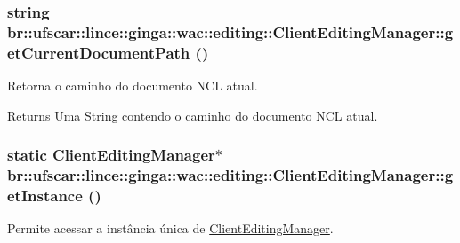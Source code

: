 \hypertarget{classbr_1_1ufscar_1_1lince_1_1ginga_1_1wac_1_1editing_1_1ClientEditingManager_aa305ed84ccf3c46501623df103d7a7e0}{
\subsubsection[{getCurrentDocumentPath}]{\setlength{\rightskip}{0pt plus 5cm}string br::ufscar::lince::ginga::wac::editing::ClientEditingManager::getCurrentDocumentPath ()}}
\label{classbr_1_1ufscar_1_1lince_1_1ginga_1_1wac_1_1editing_1_1ClientEditingManager_aa305ed84ccf3c46501623df103d7a7e0}


Retorna o caminho do documento NCL atual. 

\begin{DoxyReturn}{Returns}
Uma String contendo o caminho do documento NCL atual. 
\end{DoxyReturn}
\hypertarget{classbr_1_1ufscar_1_1lince_1_1ginga_1_1wac_1_1editing_1_1ClientEditingManager_ad72c33ccec250438af9b2c489634c42d}{
\subsubsection[{getInstance}]{\setlength{\rightskip}{0pt plus 5cm}static {\bf ClientEditingManager}$\ast$ br::ufscar::lince::ginga::wac::editing::ClientEditingManager::getInstance ()}}
\label{classbr_1_1ufscar_1_1lince_1_1ginga_1_1wac_1_1editing_1_1ClientEditingManager_ad72c33ccec250438af9b2c489634c42d}


Permite acessar a instância única de \hyperlink{classbr_1_1ufscar_1_1lince_1_1ginga_1_1wac_1_1editing_1_1ClientEditingManager}{ClientEditingManager}. 

